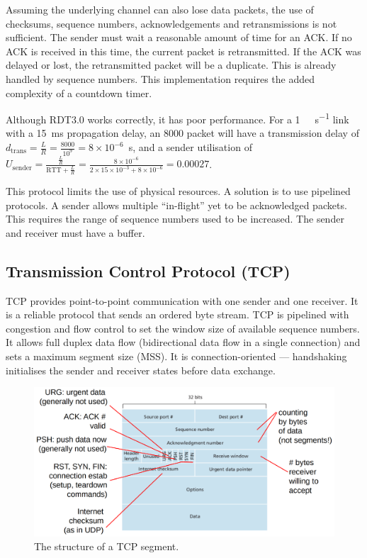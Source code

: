 Assuming the underlying channel can also lose data packets, the use of checksums, sequence numbers, acknowledgements and retransmissions is not sufficient.
The sender must wait a reasonable amount of time for an ACK.
If no ACK is received in this time, the current packet is retransmitted.
If the ACK was delayed or lost, the retransmitted packet will be a duplicate.
This is already handled by sequence numbers.
This implementation requires the added complexity of a countdown timer.

Although RDT3.0 works correctly, it has poor performance.
For a \SI{1}{\giga\bit\per\second} link with a \SI{15}{\milli\second} propagation delay, an \SI{8000}{\bit} packet will have a transmission delay of \(d_{\text{trans}} = \frac{L}{R} = \frac{8000}{10^9} = 8 \times 10^{-6}\)~\si{\second}, and a sender utilisation of \(U_{\text{sender}} = \frac{\frac{L}{R}}{\text{RTT} + \frac{L}{R}} = \frac{8 \times 10^{-6}}{2 \times 15 \times 10^{-3} + 8 \times 10^{-6}} = 0.00027\).

This protocol limits the use of physical resources.
A solution is to use pipelined protocols.
A sender allows multiple ``in-flight'' yet to be acknowledged packets.
This requires the range of sequence numbers used to be increased.
The sender and receiver must have a buffer.

\subsection{Transmission Control Protocol (TCP)}

TCP provides point-to-point communication with one sender and one receiver.
It is a reliable protocol that sends an ordered byte stream.
TCP is pipelined with congestion and flow control to set the window size of available sequence numbers.
It allows full duplex data flow (bidirectional data flow in a single connection) and sets a maximum segment size (MSS).
It is connection-oriented --- handshaking initialises the sender and receiver states before data exchange.

\begin{figure}[htp]
  \centering
  \includegraphics[width=15cm]{unit-18/figures/tcp-segment.png}
  \caption*{The structure of a TCP segment.}
\end{figure}

